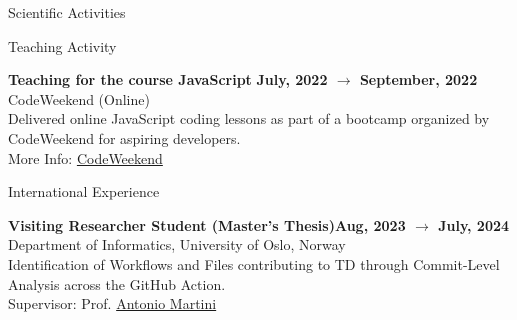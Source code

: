 \documentclass{resume} %
\begin{document}

    \begin{rSection}{Scientific Activities}

        \begin{rSubsection2}{Teaching Activity}

            \item\textbf{ Teaching for the course JavaScript }\hfill \textbf{July, 2022 $\rightarrow$ September, 2022}
            \\CodeWeekend (Online)
            \\Delivered online JavaScript coding lessons as part of a bootcamp organized by CodeWeekend for aspiring developers.
            \\More Info: \href{https://codeweekend.net/}{CodeWeekend}

        \end{rSubsection2}


        \begin{rSubsection2}{International Experience}

            \item\textbf{ Visiting Researcher Student (Master's Thesis)}\hfill \textbf{Aug, 2023 $\rightarrow$ July, 2024}
            \\Department of Informatics, University of Oslo, Norway
            \\Identification of Workflows and Files contributing to TD through Commit-Level Analysis across the GitHub Action.
            \\Supervisor: Prof. \href{mailto:antonima@ifi.uio.no}{Antonio Martini}

        \end{rSubsection2}

    \end{rSection}
\end{document}
